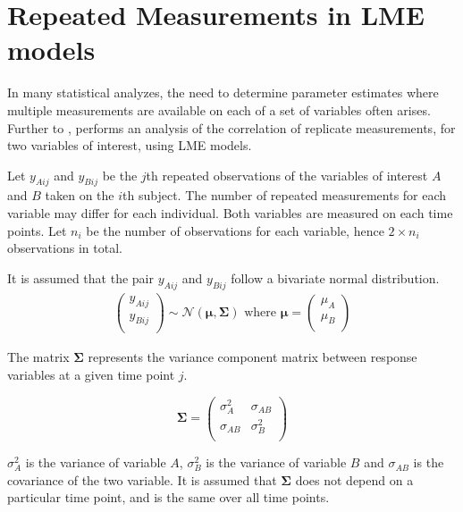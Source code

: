 \documentclass[12pt, a4paper]{report}
\theoremstyle{definition}
\theoremstyle{remark}
\begin{document}
%



\section{Repeated Measurements in LME models}

In many statistical analyzes, the need to determine parameter estimates where multiple measurements are available on each of a set of variables often arises. Further to \citet{lam}, \citet{hamlett} performs an analysis of the correlation of replicate measurements, for two variables of interest, using LME models.

Let $y_{Aij}$ and $y_{Bij}$ be the $j$th repeated observations of the variables of interest $A$ and $B$ taken on the $i$th subject. The number of repeated measurements for each variable may differ for each individual.
Both variables are measured on each time points. Let $n_{i}$ be the number of observations for each variable, hence $2\times n_{i}$ observations in total.

It is assumed that the pair $y_{Aij}$ and $y_{Bij}$ follow a bivariate normal distribution.
\begin{eqnarray*}
\left(
\begin{array}{c}
y_{Aij} \\
y_{Bij} \\
\end{array}
\right) \sim \mathcal{N}(
\boldsymbol{\mu}, \boldsymbol{\Sigma})\mbox{   where } \boldsymbol{\mu} = \left(
\begin{array}{c}
\mu_{A} \\
\mu_{B} \\
\end{array}
\right)
\end{eqnarray*}

The matrix $\boldsymbol{\Sigma}$ represents the variance component matrix between response variables at a given time point $j$.

\[
\boldsymbol{\Sigma} = \left( \begin{array}{cc}
\sigma^2_{A} & \sigma_{AB} \\
\sigma_{AB} & \sigma^2_{B}\\
\end{array}   \right)
\]

$\sigma^2_{A}$ is the variance of variable $A$, $\sigma^2_{B}$ is the variance of variable $B$ and $\sigma_{AB}$ is the covariance of the two variable. It is assumed that $\boldsymbol{\Sigma}$ does not depend on a particular time point, and is the same over all time points.
\end{document}
